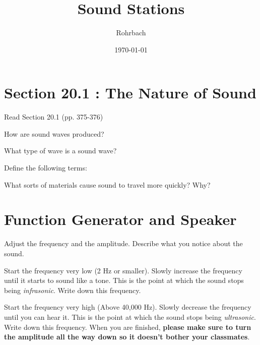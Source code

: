 \documentclass[10pt]{exam}
\title{Sound Stations}
\author{Rohrbach}
\date{\today}
\begin{document}
\maketitle

\section{Section 20.1 : The Nature of Sound}

Read Section 20.1 (pp. 375-376)

\begin{questions}
  \question 
    How are sound waves produced? \vs

  \question 
    What type of wave is a sound wave? \vs

  \question 
    Define the following terms:


  \question 
    What sorts of materials cause sound to travel more quickly?  Why? \vs

\end{questions}

\section{Function Generator and Speaker}

\begin{questions}
  \question
    Adjust the frequency and the amplitude.  Describe what you notice about the sound. \vs

  \question
    Start the frequency very low (2 Hz or smaller).  Slowly increase the frequency until it starts to sound like a tone.  This is the point at which the sound stops being \emph{infrasonic}.  Write down this frequency. \vs


  \question
    Start the frequency very high (Above 40,000 Hz).  Slowly decrease the frequency until you can hear it.  This is the point at which the sound stops being \emph{ultrasonic}.  Write down this frequency.  When you are finished, {\bf please make sure to turn the amplitude all the way down so it doesn't bother your classmates}. \vs

\pagebreak

\end{questions}
\end{document}
